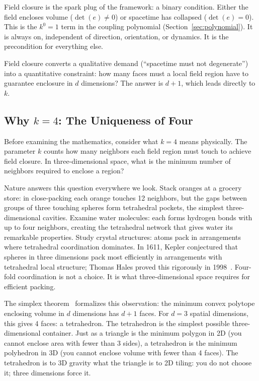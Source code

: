\documentclass[aps,prd,preprint,superscriptaddress,showpacs,preprintnumbers,amsmath,amssymb,nofootinbib]{revtex4-2}
\begin{document}
Field closure is the spark plug of the framework: a binary condition. Either the field encloses volume ($\det(e) \neq 0$) or spacetime has collapsed ($\det(e) = 0$). This is the $k^0 = 1$ term in the coupling polynomial (Section~\ref{sec:polynomial}). It is always on, independent of direction, orientation, or dynamics. It is the precondition for everything else.

Field closure converts a qualitative demand (``spacetime must not degenerate'') into a quantitative constraint: how many faces must a local field region have to guarantee enclosure in $d$ dimensions? The answer is $d + 1$, which leads directly to $k$.

\subsection{Why $k = 4$: The Uniqueness of Four}
\label{subsec:k4}

Before examining the mathematics, consider what $k = 4$ means physically. The parameter $k$ counts how many neighbors each field region must touch to achieve field closure. In three-dimensional space, what is the minimum number of neighbors required to enclose a region?

Nature answers this question everywhere we look. Stack oranges at a grocery store: in close-packing each orange touches 12 neighbors, but the gaps between groups of three touching spheres form tetrahedral pockets, the simplest three-dimensional cavities. Examine water molecules: each forms hydrogen bonds with up to four neighbors, creating the tetrahedral network that gives water its remarkable properties. Study crystal structures: atoms pack in arrangements where tetrahedral coordination dominates. In 1611, Kepler conjectured that spheres in three dimensions pack most efficiently in arrangements with tetrahedral local structure; Thomas Hales proved this rigorously in 1998~\cite{hales2005}. Four-fold coordination is not a choice. It is what three-dimensional space requires for efficient packing.

The simplex theorem~\cite{ziegler1995} formalizes this observation: the minimum convex polytope enclosing volume in $d$ dimensions has $d+1$ faces. For $d = 3$ spatial dimensions, this gives 4 faces: a tetrahedron. The tetrahedron is the simplest possible three-dimensional container. Just as a triangle is the minimum polygon in 2D (you cannot enclose area with fewer than 3 sides), a tetrahedron is the minimum polyhedron in 3D (you cannot enclose volume with fewer than 4 faces). The tetrahedron is to 3D gravity what the triangle is to 2D tiling: you do not choose it; three dimensions force it.
\end{document}
